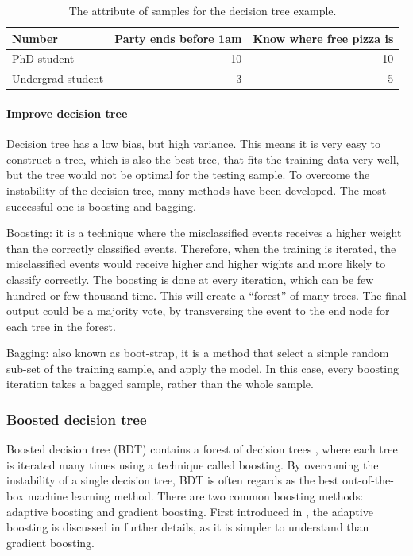 \begin{table}[!tbp]\centering
\small
\begin{tabular}{lrr}
\hline \hline
Number & Party ends before 1am  & Know where free pizza is\\
\hline
PhD student & 10 & 10 \\
Undergrad student & 3 & 5 \\
\hline \hline
\end{tabular}
\caption
{The attribute of samples for the decision tree example.}
\label{tab:doubleHiggsDecisionTreeComic}
\end{table}

\paragraph{Improve decision tree}

Decision tree has a low bias, but high variance. This means it is very easy to construct a tree, which is also the best tree, that fits the training data very well, but the tree would not be optimal for the testing sample. To overcome the instability of the decision tree, many methods have been developed. The most successful one is boosting and bagging.

Boosting: it is a technique where the misclassified events receives a higher weight than the correctly classified events. Therefore, when the training is iterated, the misclassified events would receive higher and higher wights and more likely to classify correctly. The boosting is done at every iteration, which can be few hundred or few thousand time. This will create a ``forest'' of many trees. The final output could be a majority vote, by transversing the event to the end node for each tree in the forest.

Bagging: also known as boot-strap, it is a method that select a simple random sub-set of the training sample, and apply the model. In this case, every boosting iteration takes a bagged sample, rather than the whole sample.

\subsubsection{Boosted decision tree}
\label{sec:analysisBDT}

Boosted decision tree (BDT) contains a forest of decision trees , where each tree is iterated many times using a technique called boosting.   By overcoming the instability of a single  decision tree, BDT is often regards as  the best out-of-the-box machine learning method. There are two common boosting methods: adaptive boosting and gradient boosting. First introduced in \cite{FREUND1997119}, the adaptive boosting is discussed in further details, as it is simpler to understand than gradient boosting.

